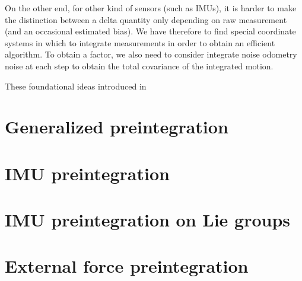 On the other end, for other kind of sensors (such as IMUs), it is harder to make the distinction between a delta quantity only depending on raw measurement (and an occasional estimated bias).
We have therefore to find special coordinate systems in which to integrate measurements in order to obtain an efficient algorithm. To obtain a factor, we also need to consider integrate 
noise odometry noise at each step to obtain the total covariance of the integrated motion.

These foundational ideas introduced in \cite{lupton-09}
  

\section{Generalized preintegration}
\section{IMU preintegration}
\section{IMU preintegration on Lie groups}
\section{External force preintegration}